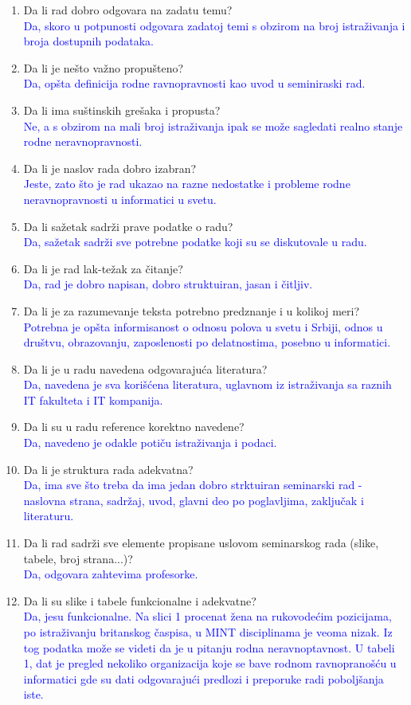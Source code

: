 \documentclass[a4paper]{report}
\newcommand{\odgovor}[1]{\textcolor{blue}{#1}}
\begin{document}
\begin{enumerate}
\item Da li rad dobro odgovara na zadatu temu?\\
\odgovor{Da, skoro u potpunosti odgovara zadatoj temi s obzirom na broj istraživanja i broja dostupnih podataka.}
\item Da li je nešto važno propušteno?\\
\odgovor{Da, opšta definicija rodne ravnopravnosti kao uvod u seminiraski rad.}
\item Da li ima suštinskih grešaka i propusta?\\
\odgovor{Ne, a s obzirom na mali broj istraživanja ipak se može sagledati realno stanje rodne neravnopravnosti.}
\item Da li je naslov rada dobro izabran?\\
\odgovor{Jeste, zato što je rad ukazao na razne nedostatke i probleme rodne neravnopravnosti u informatici u svetu.}
\item Da li sažetak sadrži prave podatke o radu?\\
\odgovor{Da, sažetak sadrži sve potrebne podatke koji su se diskutovale u radu.}
\item Da li je rad lak-težak za čitanje?\\
\odgovor{Da, rad je dobro napisan, dobro struktuiran, jasan i čitljiv.}
\item Da li je za razumevanje teksta potrebno predznanje i u kolikoj meri?\\
\odgovor{Potrebna je opšta informisanost o odnosu polova u svetu i Srbiji, odnos u društvu, obrazovanju, zaposlenosti po delatnostima, posebno u informatici.}
\item Da li je u radu navedena odgovarajuća literatura?\\
\odgovor{Da, navedena je sva korišćena literatura, uglavnom iz istraživanja sa raznih IT fakulteta i IT kompanija.}
\item Da li su u radu reference korektno navedene?\\
\odgovor{Da, navedeno je odakle potiču istraživanja i podaci.}
\item Da li je struktura rada adekvatna?\\
\odgovor{Da, ima sve što treba da ima jedan dobro strktuiran seminarski rad - naslovna strana, sadržaj, uvod, glavni deo po poglavljima, zaključak i literaturu.}
\item Da li rad sadrži sve elemente propisane uslovom seminarskog rada (slike, tabele, broj strana...)?\\
\odgovor{Da, odgovara zahtevima profesorke.}
\item Da li su slike i tabele funkcionalne i adekvatne?\\
\odgovor{Da, jesu funkcionalne. Na slici 1 procenat žena na rukovodećim pozicijama, po istraživanju britanskog časpisa, u MINT
disciplinama je veoma nizak. Iz tog podatka može se videti da je u pitanju rodna neravnoptavnost. U tabeli 1, dat je pregled nekoliko organizacija koje se bave rodnom ravnopranošću u informatici gde su dati odgovarajući predlozi i preporuke radi poboljšanja iste.}
\end{enumerate}
\end{document}

